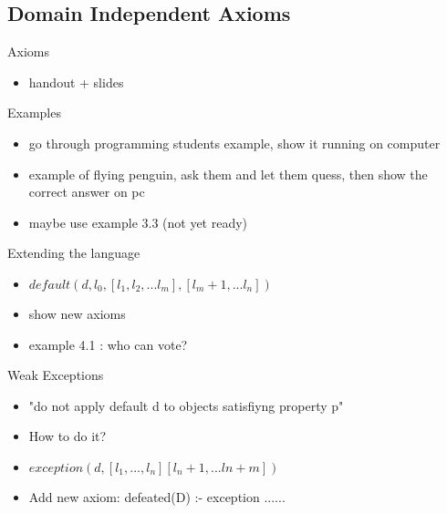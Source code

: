 \documentclass{beamer}
\begin{document}
  
  \subsection{Domain Independent Axioms}
  
  \begin{frame}{Axioms}
    \begin{itemize}
      \item handout + slides
    \end{itemize}
  \end{frame}
  
  
  \begin{frame}{Examples}
    \begin{itemize}
      \item go through programming students example, show it running on computer
      \item example of flying penguin, ask them and let them quess,
        then show the correct answer on pc
      \item maybe use example 3.3 (not yet ready)
    \end{itemize}
  \end{frame}
  
  
  \begin{frame}{Extending the language}
    \begin{itemize}
      \item $default(d,l_0,[l_1, l_2, ... l_m], [l_m+1, ... l_n])$
      \item show new axioms
      \item example 4.1 : who can vote?
    \end{itemize}
  \end{frame}
  
  
  \begin{frame}{Weak Exceptions}
    \begin{itemize}
      \item "do not apply default d to objects satisfiyng property p" 
      \item How to do it?
      \item $exception(d, [l_1, ... ,l_n] [l_n+1,...ln+m])$
      \item Add new axiom: defeated(D) :- exception ......    
    \end{itemize}
  \end{frame}
  
\end{document}
